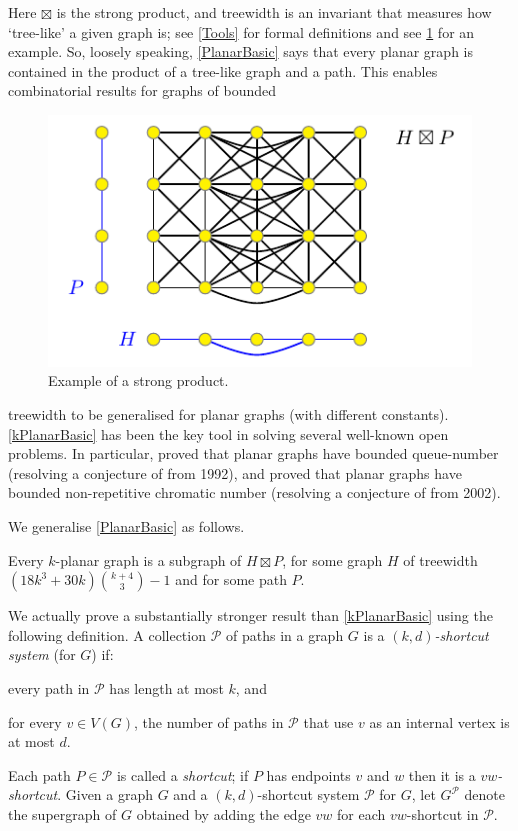 \documentclass{patmorin}
\begin{document}
Here $\boxtimes$ is the strong product, and treewidth is an invariant that measures how `tree-like' a given graph is; see \cref{Tools} for formal definitions and see \cref{ProductExample} for an example.  
So, loosely speaking, \cref{PlanarBasic} says that every planar graph is contained in the product of a tree-like graph and a path. This enables combinatorial results for graphs of bounded 
\begin{figure} 
\centering
\includegraphics{ProductExample}
\caption{Example of a strong product.}
\label{ProductExample}
\end{figure}
treewidth to be generalised for planar graphs (with different constants). \cref{kPlanarBasic} has been the key tool in solving several well-known open problems. In particular, \citet{dujmovic.joret.ea:planar} proved that planar graphs have bounded queue-number (resolving a conjecture of \citet{HLR92} from 1992), and \citet{dujmovic.esperet.ea:planar}  proved that planar graphs have bounded non-repetitive chromatic number (resolving a conjecture of \citet{AGHR-RSA02} from 2002). 

We generalise \cref{PlanarBasic} as follows. 

\begin{thm}
\label{kPlanarBasic}
Every $k$-planar graph is a subgraph of $H\boxtimes P$, for some graph $H$ of treewidth $(18k^3+30k)\binom{k+4}{3}-1$ and for some path $P$. 
\end{thm}

We actually prove a substantially stronger result than \cref{kPlanarBasic} using the following definition. A collection $\mathcal{P}$ of paths in a graph $G$ is a \emph{$(k,d)$-shortcut system} (for $G$) if:
\begin{compactitem}
\item every path in $\mathcal{P}$ has length at most $k$, and
\item for every $v\in V(G)$, the number of paths in $\mathcal{P}$ that use $v$ as an internal vertex is at most $d$.
\end{compactitem} 
Each path $P\in\mathcal{P}$ is called a \emph{shortcut}; if $P$ has endpoints $v$ and $w$ then it is a \emph{$vw$-shortcut}. Given a graph $G$ and a $(k,d)$-shortcut system $\mathcal{P}$ for $G$, let $G^{\mathcal{P}}$ denote the supergraph of $G$ obtained by adding the edge $vw$ for each $vw$-shortcut in $\mathcal{P}$. 
\end{document}
